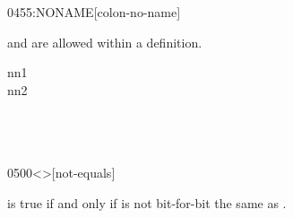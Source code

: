 \begin{worddef}{0455}{:NONAME}[colon-no-name]
\begin{rationale}
	\note {} and  are allowed within a  definition.
	\end{rationale}

	\begin{testing} %
	 nn1 \\
	 nn2 \\
	 \\
	 \\
	 \\
	\end{testing}
\end{worddef}


\begin{worddef}[ne]{0500}{<>}[not-equals]
\item {}

	 is true if and only if  is not bit-for-bit
	the same as .
\end{worddef}


